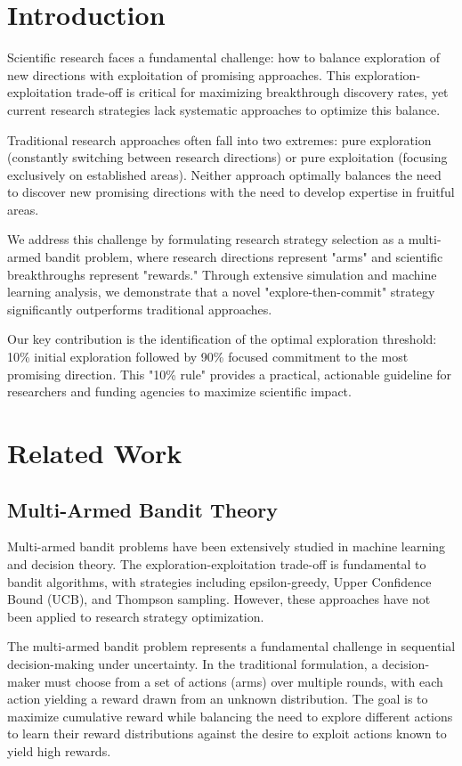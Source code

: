 \documentclass[letterpaper]{article}
\begin{document}
\section{Introduction}

Scientific research faces a fundamental challenge: how to balance exploration of new directions with exploitation of promising approaches. This exploration-exploitation trade-off is critical for maximizing breakthrough discovery rates, yet current research strategies lack systematic approaches to optimize this balance.

Traditional research approaches often fall into two extremes: pure exploration (constantly switching between research directions) or pure exploitation (focusing exclusively on established areas). Neither approach optimally balances the need to discover new promising directions with the need to develop expertise in fruitful areas.

We address this challenge by formulating research strategy selection as a multi-armed bandit problem, where research directions represent "arms" and scientific breakthroughs represent "rewards." Through extensive simulation and machine learning analysis, we demonstrate that a novel "explore-then-commit" strategy significantly outperforms traditional approaches.

Our key contribution is the identification of the optimal exploration threshold: 10\% initial exploration followed by 90\% focused commitment to the most promising direction. This "10\% rule" provides a practical, actionable guideline for researchers and funding agencies to maximize scientific impact.

\section{Related Work}

\subsection{Multi-Armed Bandit Theory}

Multi-armed bandit problems have been extensively studied in machine learning and decision theory. The exploration-exploitation trade-off is fundamental to bandit algorithms, with strategies including epsilon-greedy, Upper Confidence Bound (UCB), and Thompson sampling. However, these approaches have not been applied to research strategy optimization.

The multi-armed bandit problem represents a fundamental challenge in sequential decision-making under uncertainty. In the traditional formulation, a decision-maker must choose from a set of actions (arms) over multiple rounds, with each action yielding a reward drawn from an unknown distribution. The goal is to maximize cumulative reward while balancing the need to explore different actions to learn their reward distributions against the desire to exploit actions known to yield high rewards.
\end{document}
